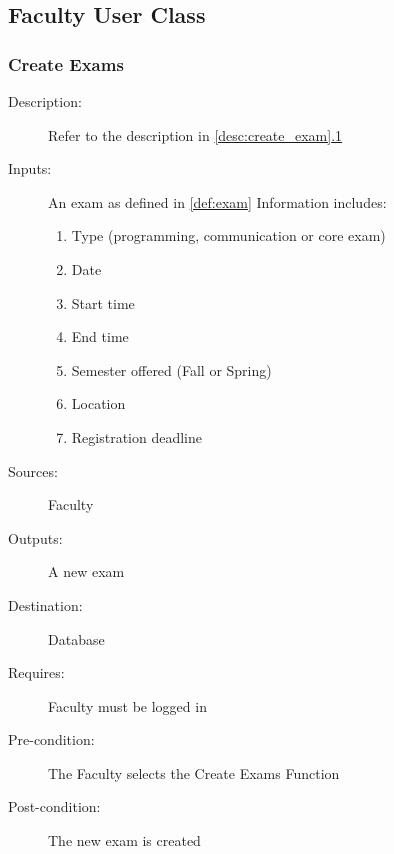 \subsection{Faculty User Class}

\subsubsection{\large Create Exams} 
\begin{boxed} %
\begin{description}
\item[Description:]
   Refer to the description in \autoref{desc:create_exam}\hyperref[desc:create_exam]{.1}
\item[Inputs:]
   An exam as defined in \autoref{def:exam} Information includes:
   \begin{enumerate}
      \item Type (programming, communication or core exam)
      \item Date
      \item Start time
      \item End time
      \item Semester offered (Fall or Spring)
      \item Location
      \item Registration deadline
   \end{enumerate}
\item[Sources:]
   Faculty
\item[Outputs:]
   A new exam
\item[Destination:]
   Database
\item[Requires:]
   Faculty must be logged in
\item[Pre-condition:]
   The Faculty selects the Create Exams Function
\item[Post-condition:]
   The new exam is created
\end{description}
\end{boxed} %

